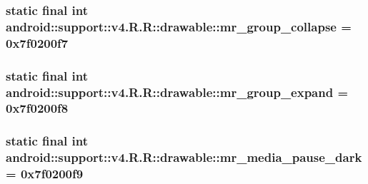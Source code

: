 \hypertarget{classandroid_1_1support_1_1v4_1_1_r_1_1drawable_613950e6f65280aeab4fcb73772a17c6}{
\subsubsection[{mr\_\-group\_\-collapse}]{\setlength{\rightskip}{0pt plus 5cm}static final int android::support::v4.R.R::drawable::mr\_\-group\_\-collapse = 0x7f0200f7}}
\label{classandroid_1_1support_1_1v4_1_1_r_1_1drawable_613950e6f65280aeab4fcb73772a17c6}


\hypertarget{classandroid_1_1support_1_1v4_1_1_r_1_1drawable_647fe49ffaf0c33311de56dcdfb60590}{
\subsubsection[{mr\_\-group\_\-expand}]{\setlength{\rightskip}{0pt plus 5cm}static final int android::support::v4.R.R::drawable::mr\_\-group\_\-expand = 0x7f0200f8}}
\label{classandroid_1_1support_1_1v4_1_1_r_1_1drawable_647fe49ffaf0c33311de56dcdfb60590}


\hypertarget{classandroid_1_1support_1_1v4_1_1_r_1_1drawable_741c344c2b5c7ee00bb24c068350ce08}{
\subsubsection[{mr\_\-media\_\-pause\_\-dark}]{\setlength{\rightskip}{0pt plus 5cm}static final int android::support::v4.R.R::drawable::mr\_\-media\_\-pause\_\-dark = 0x7f0200f9}}
\label{classandroid_1_1support_1_1v4_1_1_r_1_1drawable_741c344c2b5c7ee00bb24c068350ce08}


